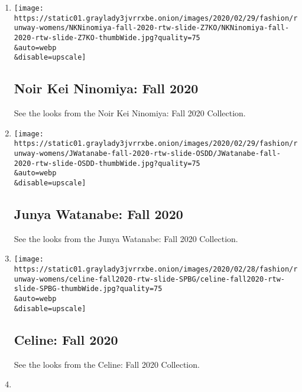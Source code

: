 \begin{enumerate}
\def\labelenumi{\arabic{enumi}.}
\item
  \href{/slideshow/2020/02/29/fashion/runway-womens/noir-kei-ninomiya-fall-2020.html}{}

  \texttt{[image: https://static01.graylady3jvrrxbe.onion/images/2020/02/29/fashion/runway-womens/NKNinomiya-fall-2020-rtw-slide-Z7KO/NKNinomiya-fall-2020-rtw-slide-Z7KO-thumbWide.jpg?quality=75\\\&auto=webp\\\&disable=upscale]}

  \hypertarget{noir-kei-ninomiya-fall-2020}{%
  \subsection{Noir Kei Ninomiya: Fall
  2020}\label{noir-kei-ninomiya-fall-2020}}

  See the looks from the Noir Kei Ninomiya: Fall 2020 Collection.
\item
  \href{/slideshow/2020/02/29/fashion/runway-womens/junya-watanabe-fall-2020.html}{}

  \texttt{[image: https://static01.graylady3jvrrxbe.onion/images/2020/02/29/fashion/runway-womens/JWatanabe-fall-2020-rtw-slide-OSDD/JWatanabe-fall-2020-rtw-slide-OSDD-thumbWide.jpg?quality=75\\\&auto=webp\\\&disable=upscale]}

  \hypertarget{junya-watanabe-fall-2020}{%
  \subsection{Junya Watanabe: Fall
  2020}\label{junya-watanabe-fall-2020}}

  See the looks from the Junya Watanabe: Fall 2020 Collection.
\item
  \href{/slideshow/2020/02/28/fashion/runway-womens/celine-fall-2020.html}{}

  \texttt{[image: https://static01.graylady3jvrrxbe.onion/images/2020/02/28/fashion/runway-womens/celine-fall2020-rtw-slide-SPBG/celine-fall2020-rtw-slide-SPBG-thumbWide.jpg?quality=75\\\&auto=webp\\\&disable=upscale]}

  \hypertarget{celine-fall-2020}{%
  \subsection{Celine: Fall 2020}\label{celine-fall-2020}}

  See the looks from the Celine: Fall 2020 Collection.
\item
  \href{/slideshow/2020/02/28/fashion/runway-womens/balmain-fall-2020.html}{}


\end{enumerate}
